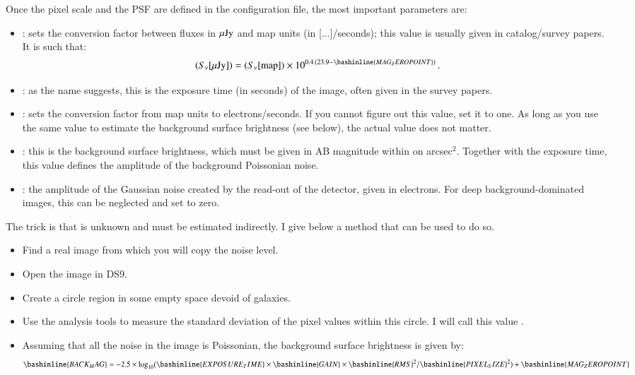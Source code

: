 Once the pixel scale and the PSF are defined in the \skymaker configuration file, the most important parameters are:
\begin{itemize}
\item {}: sets the conversion factor between fluxes in $\mu{\rm Jy}$ and map units (in [...]/seconds); this value is usually given in catalog/survey papers. It is such that:
\begin{equation}
    (S_\nu [\uJy]) = (S_\nu [{\rm map}]) \times 10^{0.4\,(23.9 - \bashinline{MAG_ZEROPOINT})}\,. \nonumber
\end{equation}
\item {}: as the name suggests, this is the exposure time (in seconds) of the image, often given in the survey papers.
\item {}: sets the conversion factor from map units to electrons/seconds. If you cannot figure out this value, set it to one. As long as you use the same value to estimate the background surface brightness (see below), the actual value does not matter.
\item {}: this is the background surface brightness, which must be given in AB magnitude within on arcsec$^2$. Together with the exposure time, this value defines the amplitude of the background Poissonian noise.
\item {}: the amplitude of the Gaussian noise created by the read-out of the detector, given in electrons. For deep background-dominated images, this can be neglected and set to zero.
\end{itemize}

The trick is that  is unknown and must be estimated indirectly. I give below a method that can be used to do so.
\begin{itemize}
\item Find a real image from which you will copy the noise level.
\item Open the image in DS9.
\item Create a circle region in some empty space devoid of galaxies.
\item Use the analysis tools to measure the standard deviation of the pixel values within this circle. I will call this value .
\item Assuming that all the noise in the image is Poissonian, the background surface brightness is given by:
\begin{equation}
    \bashinline{BACK_MAG} = -2.5\times\log_{10}(\bashinline{EXPOSURE_TIME}\times\bashinline{GAIN} \times \bashinline{RMS}^2/\bashinline{PIXEL_SIZE}^2) + \bashinline{MAG_ZEROPOINT} \nonumber
\end{equation}
\end{itemize}

